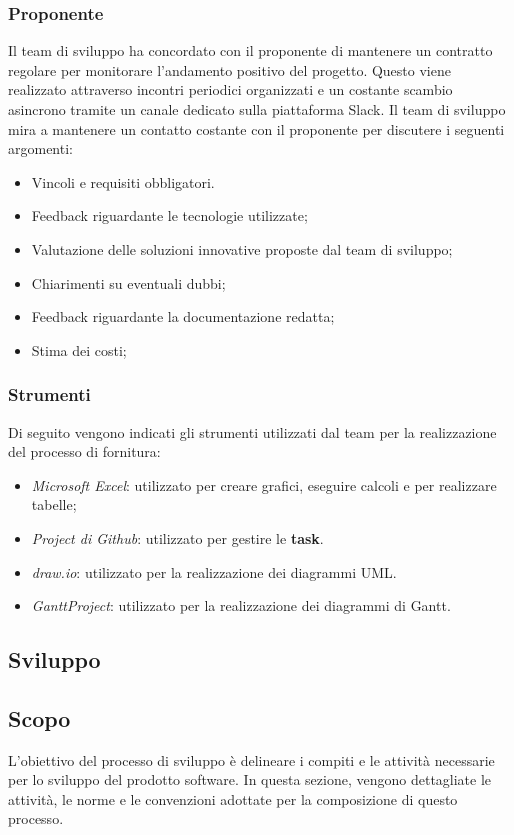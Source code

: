 \documentclass{article}
\begin{document}
\subsubsection{Proponente}
Il team di sviluppo ha concordato con il proponente di mantenere un contratto regolare per monitorare l'andamento positivo del progetto. Questo viene realizzato attraverso incontri periodici organizzati e un costante scambio asincrono tramite un canale dedicato sulla piattaforma Slack. Il team di sviluppo mira a mantenere un contatto costante con il proponente per discutere i seguenti argomenti:
\begin{itemize}
    \item Vincoli e requisiti obbligatori.
    \item Feedback riguardante le tecnologie utilizzate;
    \item Valutazione delle soluzioni innovative proposte dal team di sviluppo;
    \item Chiarimenti su eventuali dubbi;
    \item Feedback riguardante la documentazione redatta;
    \item Stima dei costi;
\end{itemize}

\subsubsection*{Strumenti}
Di seguito vengono indicati gli strumenti utilizzati dal team per la realizzazione del processo di fornitura:\begin{itemize}
    \item \textit{Microsoft Excel}: utilizzato per creare grafici, eseguire calcoli e per realizzare tabelle;
    \item \textit{Project di Github}: utilizzato per gestire le \textbf{task}.
    \item \textit{draw.io}: utilizzato per la realizzazione dei diagrammi UML.
    \item \textit{GanttProject}: utilizzato per la realizzazione dei diagrammi di Gantt.
\end{itemize}

\subsection{Sviluppo}

\subsection{Scopo}
L'obiettivo del processo di sviluppo è delineare i compiti e le attività necessarie per lo sviluppo del prodotto software. In questa sezione, vengono dettagliate le attività, le norme e le convenzioni adottate per la composizione di questo processo.
\end{document}
